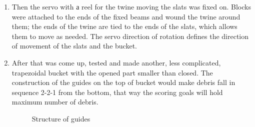 \begin{enumerate}
  \item Then the servo with а reel for the twine moving the slats was fixed on. Blocks were attached to the ends of the fixed beams and wound the twine around them; the ends of the twine are tied to the ends of the slats, which allows them to move as needed. The servo direction of rotation defines the direction of movement of the slats and the bucket. 	
  
  \item After that was come up, tested and made another, less complicated, trapezoidal bucket with the opened part smaller than closed. The construction of the guides on the top of bucket would make debris fall in sequence 2-2-1 from the bottom, that way the scoring goals will hold maximum number of debris.
  \begin{figure}[H]
  	\begin{minipage}[h]{0.31\linewidth}
  		\caption{Structure of guides}
  	\end{minipage}
  	\hfill
  	\begin{minipage}[h]{0.31\linewidth}

\end{minipage}
\end{figure}
\end{enumerate}

